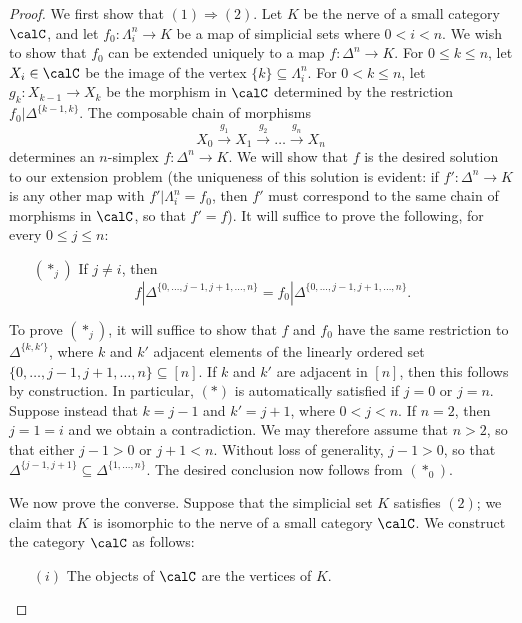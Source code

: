 \begin{proof}
We first show that $(1) \Rightarrow (2)$. Let $K$ be the nerve of a small category
$\calC$, and let $f_0: \Lambda^n_i \rightarrow K$ be a map of simplicial sets where
$0 < i < n$. We wish to show that $f_0$ can be extended uniquely to a map $f: \Delta^n \rightarrow K$.
For $0 \leq k \leq n$, let $X_i \in \calC$ be the image of the vertex $\{k\} \subseteq \Lambda^n_i$.
For $0 < k \leq n$, let $g_k: X_{k-1} \rightarrow X_{k}$ be the morphism in $\calC$ determined by the restriction $f_0 | \Delta^{ \{k-1,k\} }$. The composable chain of morphisms
$$ X_0 \stackrel{ g_1}{\rightarrow} X_1 \stackrel{g_2}{\rightarrow} \ldots \stackrel{g_n}{\rightarrow} X_n$$
determines an $n$-simplex $f: \Delta^n \rightarrow K$. We will show that $f$ is the desired solution to our extension problem (the uniqueness of this solution is evident: if $f': \Delta^n \rightarrow K$ is
any other map with $f' | \Lambda^n_i = f_0$, then $f'$ must correspond to the same chain of morphisms
in $\calC$, so that $f' = f$). It will suffice to prove the following, for every $0 \leq j \leq n$:
\begin{itemize}
\item[$(\ast_j)$] If $j \neq i$, then 
$$ f | \Delta^{ \{0, \ldots, j-1, j+1, \ldots, n \} } = f_0 | \Delta^{ \{0, \ldots, j-1, j+1, \ldots, n \} }.$$
\end{itemize}
To prove $(\ast_j)$, it will suffice to show that $f$ and $f_0$ have the same
restriction to $\Delta^{ \{k,k' \} }$, where $k$ and $k'$ adjacent
elements of the linearly ordered set $\{ 0, \ldots, j-1, j+1, \ldots, n \} \subseteq [n]$.
If $k$ and $k'$ are adjacent in $[n]$, then this follows by construction. In particular,
$(\ast)$ is automatically satisfied if $j=0$ or $j=n$.
Suppose instead that $k = j-1$ and $k' = j+1$, where $0 < j < n$. If $n = 2$, then $j=1=i$ and we obtain a contradiction. We may therefore assume that $n > 2$, so that either $j-1 > 0$ or
$j+1 < n$. Without loss of generality, $j-1 > 0$, so that $\Delta^{ \{ j-1, j+1 \} }
\subseteq \Delta^{ \{1, \ldots, n \} }$. The desired conclusion now follows from $(\ast_0)$.

We now prove the converse. Suppose that the simplicial set $K$ satisfies $(2)$; we claim that
$K$ is isomorphic to the nerve of a small category $\calC$. We construct the category
$\calC$ as follows:
\begin{itemize}
\item[$(i)$] The objects of $\calC$ are the vertices of $K$.


\end{itemize}
\end{proof}
